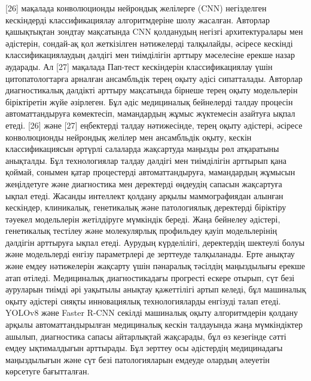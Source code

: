 \begin{multicols}{2}
{[}26{]} мақалада конволюционды нейрондық желілерге (CNN) негізделген
кескіндерді классификациялау алгоритмдеріне шолу жасалған. Авторлар
қашықтықтан зондтау мақсатында CNN қолданудың негізгі архитектуралары
мен әдістерін, сондай-ақ қол жеткізілген нәтижелерді талқылайды, әсіресе
кескінді классификациялаудың дәлдігі мен тиімділігін арттыру мәселесіне
ерекше назар аударады. Ал {[}27{]} мақалада Пап-тест кескіндерін
классификациялау үшін цитопатологтарға арналған ансамбльдік терең оқыту
әдісі сипатталады. Авторлар диагностикалық дәлдікті арттыру мақсатында
бірнеше терең оқыту модельлерін біріктіретін жүйе әзірлеген. Бұл әдіс
медициналық бейнелерді талдау процесін автоматтандыруға көмектесіп,
мамандардың жұмыс жүктемесін азайтуға ықпал етеді. {[}26{]} және
{[}27{]} еңбектерді талдау нәтижесінде, терең оқыту әдістері, әсіресе
конволюционды нейрондық желілер мен ансамбльдік оқыту, кескін
классификациясын әртүрлі салаларда жақсартуда маңызды рөл атқаратыны
анықталды. Бұл технологиялар талдау дәлдігі мен тиімділігін арттырып
қана қоймай, сонымен қатар процестерді автоматтандыруға, мамандардың
жұмысын жеңілдетуге және диагностика мен деректерді өңдеудің сапасын
жақсартуға ықпал етеді. Жасанды интеллект қолдану арқылы маммографиядан
алынған кескіндер, клиникалық, генетикалық және патологиялық деректерді
біріктіру тәуекел модельлерін жетілдіруге мүмкіндік береді. Жаңа
бейнелеу әдістері, генетикалық тестілеу және молекулярлық профильдеу
қауіп модельлерінің дәлдігін арттыруға ықпал етеді. Аурудың күрделілігі,
деректердің шектеулі болуы және модельлерді енгізу параметрлері де
зерттеуде талқыланады. Ерте анықтау және емдеу нәтижелерін жақсарту үшін
пәнаралық тәсілдің маңыздылығы ерекше атап өтіледі. Медициналық
диагностикадағы прогресті ескере отырып, сүт безі ауруларын тиімді әрі
уақытылы анықтау қажеттілігі артып келеді, бұл машиналық оқыту әдістері
сияқты инновациялық технологияларды енгізуді талап етеді. YOLOv8 және
Faster R-CNN секілді машиналық оқыту алгоритмдерін қолдану арқылы
автоматтандырылған медициналық кескін талдауында жаңа мүмкіндіктер
ашылып, диагностика сапасы айтарлықтай жақсарады, бұл өз кезегінде сәтті
емдеу ықтималдығын арттырады. Бұл зерттеу осы әдістердің медицинадағы
маңыздылығын және сүт безі патологияларын емдеуде олардың әлеуетін
көрсетуге бағытталған.


\end{multicols}
